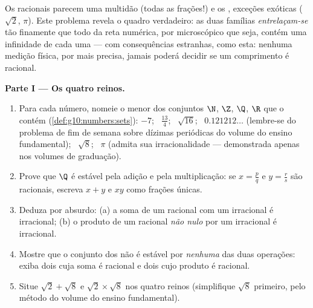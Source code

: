 \begin{problem}
\label{pb:g10:numbers:1}
Os racionais parecem uma multidão (todas as frações!) e os ,
exceções exóticas ($\sqrt2$, $\pi$). Este problema revela o quadro
verdadeiro: as duas famílias \emph{entrelaçam-se} tão finamente que todo
 da reta numérica, por microscópico que seja, contém uma
infinidade de cada uma --- com consequências estranhas, como esta:
nenhuma medição física, por mais precisa, jamais poderá decidir se um
comprimento é racional.

\medskip
\noindent\textbf{Parte I --- Os quatro reinos.}
\begin{enumerate}
  \item Para cada número, nomeie o menor dos conjuntos $\N$,
        $\Z$, $\Q$, $\R$ que o contém
        (\cref{def:g10:numbers:sets}): $-7$; \ $\frac{13}{4}$; \
        $\sqrt{16}$; \ $0.121212\ldots$ (lembre-se do problema
        de fim de semana sobre dízimas periódicas do volume do
        ensino fundamental); \ $\sqrt8$; \ $\pi$ (admita sua
        irracionalidade --- demonstrada apenas nos volumes de
        graduação).
  \item Prove que $\Q$ é estável pela adição e pela
        multiplicação: se $x = \frac pq$ e $y = \frac rs$ são
        racionais, escreva $x + y$ e $xy$ como frações únicas.
  \item Deduza por absurdo: (a) a soma de um racional com um
        irracional é irracional; (b) o produto de um racional
        \emph{não nulo} por um irracional é irracional.
  \item Mostre que o conjunto dos  não é estável por
        \emph{nenhuma} das duas operações: exiba dois
         cuja soma é racional e dois cujo produto é
        racional.
  \item Situe $\sqrt2 + \sqrt8$ e $\sqrt2 \times \sqrt8$ nos
        quatro reinos (simplifique $\sqrt8$ primeiro, pelo
        método do volume do ensino fundamental).
\end{enumerate}


\end{problem}
